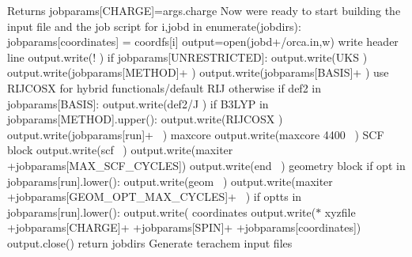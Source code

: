 \begin{DoxyReturn}{Returns}
jobparams\mbox{[}\textquotesingle{}C\+H\+A\+R\+GE\textquotesingle{}\mbox{]}=args.\+charge Now we\textquotesingle{}re ready to start building the input file and the job script for i,jobd in enumerate(jobdirs)\+: jobparams\mbox{[}\textquotesingle{}coordinates\textquotesingle{}\mbox{]} = coordfs\mbox{[}i\mbox{]} output=open(jobd+\textquotesingle{}/orca.in\textquotesingle{},\textquotesingle{}w\textquotesingle{}) write header line output.\+write(\textquotesingle{}! \textquotesingle{}) if jobparams\mbox{[}\textquotesingle{}U\+N\+R\+E\+S\+T\+R\+I\+C\+T\+ED\textquotesingle{}\mbox{]}\+: output.\+write(\textquotesingle{}U\+KS \textquotesingle{}) output.\+write(jobparams\mbox{[}\textquotesingle{}M\+E\+T\+H\+OD\textquotesingle{}\mbox{]}+\textquotesingle{} \textquotesingle{}) output.\+write(jobparams\mbox{[}\textquotesingle{}B\+A\+S\+IS\textquotesingle{}\mbox{]}+\textquotesingle{} \textquotesingle{}) use R\+I\+J\+C\+O\+SX for hybrid functionals/default R\+IJ otherwise if \textquotesingle{}def2\textquotesingle{} in jobparams\mbox{[}\textquotesingle{}B\+A\+S\+IS\textquotesingle{}\mbox{]}\+: output.\+write(\textquotesingle{}def2/J \textquotesingle{}) if \textquotesingle{}B3\+L\+YP\textquotesingle{} in jobparams\mbox{[}\textquotesingle{}M\+E\+T\+H\+OD\textquotesingle{}\mbox{]}.upper()\+: output.\+write(\textquotesingle{}R\+I\+J\+C\+O\+SX \textquotesingle{}) output.\+write(jobparams\mbox{[}\textquotesingle{}run\textquotesingle{}\mbox{]}+\textquotesingle{}~\newline
\textquotesingle{}) maxcore output.\+write(\textquotesingle{}maxcore 4400~\newline
\textquotesingle{}) S\+CF block output.\+write(\textquotesingle{}scf~\newline
\textquotesingle{}) output.\+write(\textquotesingle{}maxiter \textquotesingle{}+jobparams\mbox{[}\textquotesingle{}M\+A\+X\+\_\+\+S\+C\+F\+\_\+\+C\+Y\+C\+L\+ES\textquotesingle{}\mbox{]}) output.\+write(\textquotesingle{}end~\newline
\textquotesingle{}) geometry block if \textquotesingle{}opt\textquotesingle{} in jobparams\mbox{[}\textquotesingle{}run\textquotesingle{}\mbox{]}.lower()\+: output.\+write(\textquotesingle{}geom~\newline
\textquotesingle{}) output.\+write(\textquotesingle{}maxiter \textquotesingle{}+jobparams\mbox{[}\textquotesingle{}G\+E\+O\+M\+\_\+\+O\+P\+T\+\_\+\+M\+A\+X\+\_\+\+C\+Y\+C\+L\+ES\textquotesingle{}\mbox{]}+\textquotesingle{}~\newline
\textquotesingle{}) if \textquotesingle{}optts\textquotesingle{} in jobparams\mbox{[}\textquotesingle{}run\textquotesingle{}\mbox{]}.lower()\+: output.\+write(\textquotesingle{} coordinates output.\+write(\textquotesingle{}$\ast$ xyzfile \textquotesingle{}+jobparams\mbox{[}\textquotesingle{}C\+H\+A\+R\+GE\textquotesingle{}\mbox{]}+\textquotesingle{} \textquotesingle{}+jobparams\mbox{[}\textquotesingle{}S\+P\+IN\textquotesingle{}\mbox{]}+\textquotesingle{} \textquotesingle{}+jobparams\mbox{[}\textquotesingle{}coordinates\textquotesingle{}\mbox{]}) output.\+close() return jobdirs Generate terachem input files 
\end{DoxyReturn}

